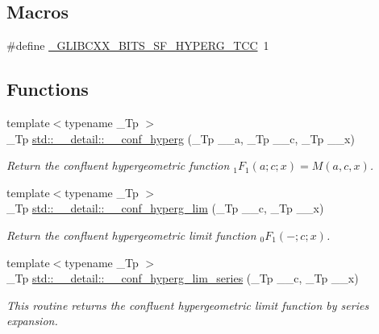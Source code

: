 \subsection*{Macros}
\begin{DoxyCompactItemize}
\item 
\#define \hyperlink{sf__hyperg_8tcc_a44f11aa09d05c90efbd3f7e1184f3a92}{\+\_\+\+G\+L\+I\+B\+C\+X\+X\+\_\+\+B\+I\+T\+S\+\_\+\+S\+F\+\_\+\+H\+Y\+P\+E\+R\+G\+\_\+\+T\+CC}~1
\end{DoxyCompactItemize}
\subsection*{Functions}
\begin{DoxyCompactItemize}
\item 
{\footnotesize template$<$typename \+\_\+\+Tp $>$ }\\\+\_\+\+Tp \hyperlink{namespacestd_1_1____detail_a3cb3151857e9ac01bc442c90301365ee}{std\+::\+\_\+\+\_\+detail\+::\+\_\+\+\_\+conf\+\_\+hyperg} (\+\_\+\+Tp \+\_\+\+\_\+a, \+\_\+\+Tp \+\_\+\+\_\+c, \+\_\+\+Tp \+\_\+\+\_\+x)
\begin{DoxyCompactList}\small\item\em Return the confluent hypergeometric function $ {}_1F_1(a;c;x) = M(a,c,x) $. \end{DoxyCompactList}\item 
{\footnotesize template$<$typename \+\_\+\+Tp $>$ }\\\+\_\+\+Tp \hyperlink{namespacestd_1_1____detail_adc839c2b3faad5d78bf64236c5c7af73}{std\+::\+\_\+\+\_\+detail\+::\+\_\+\+\_\+conf\+\_\+hyperg\+\_\+lim} (\+\_\+\+Tp \+\_\+\+\_\+c, \+\_\+\+Tp \+\_\+\+\_\+x)
\begin{DoxyCompactList}\small\item\em Return the confluent hypergeometric limit function $ {}_0F_1(-;c;x) $. \end{DoxyCompactList}\item 
{\footnotesize template$<$typename \+\_\+\+Tp $>$ }\\\+\_\+\+Tp \hyperlink{namespacestd_1_1____detail_a44b73ec79e0a8cfd1f29a21cb39f2bdc}{std\+::\+\_\+\+\_\+detail\+::\+\_\+\+\_\+conf\+\_\+hyperg\+\_\+lim\+\_\+series} (\+\_\+\+Tp \+\_\+\+\_\+c, \+\_\+\+Tp \+\_\+\+\_\+x)
\begin{DoxyCompactList}\small\item\em This routine returns the confluent hypergeometric limit function by series expansion. \end{DoxyCompactList}\item 

\end{DoxyCompactItemize}
